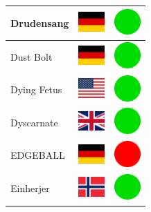 \documentclass[12pt, a4paper, twoside]{report}
\begin{document}
\begin{center}
\begin{longtable}{|p{5cm}|p{2cm}|p{2cm}|}
 Drudensang                                                 & \includegraphics[width=1cm]{../4x3/de} &   \includegraphics[width=1cm]{../likes/y} \\ \hline
 Dust Bolt                                                  & \includegraphics[width=1cm]{../4x3/de} &   \includegraphics[width=1cm]{../likes/y} \\ \hline
 Dying Fetus                                                & \includegraphics[width=1cm]{../4x3/us} &   \includegraphics[width=1cm]{../likes/y} \\ \hline
 Dyscarnate                                                 & \includegraphics[width=1cm]{../4x3/gb} &   \includegraphics[width=1cm]{../likes/y} \\ \hline
 EDGEBALL                                                   & \includegraphics[width=1cm]{../4x3/de} &   \includegraphics[width=1cm]{../likes/n} \\ \hline
 Einherjer                                                  & \includegraphics[width=1cm]{../4x3/no} &   \includegraphics[width=1cm]{../likes/y} \\ \hline

\end{longtable}
\end{center}
\end{document}

